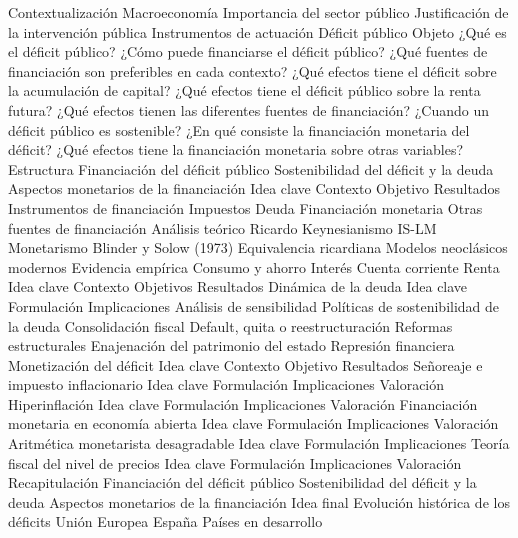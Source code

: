 \documentclass{nuevotema}
\begin{document}
\begin{esquema}[enumerate]
	\1[] 
		\2 Contextualización
			\3 Macroeconomía
			\3 Importancia del sector público
			\3 Justificación de la intervención pública
			\3 Instrumentos de actuación
			\3 Déficit público
		\2 Objeto
			\3 ¿Qué es el déficit público?
			\3 ¿Cómo puede financiarse el déficit público?
			\3 ¿Qué fuentes de financiación son preferibles en cada contexto?
			\3 ¿Qué efectos tiene el déficit sobre la acumulación de capital?
			\3 ¿Qué efectos tiene el déficit público sobre la renta futura?
			\3 ¿Qué efectos tienen las diferentes fuentes de financiación?
			\3 ¿Cuando un déficit público es sostenible?
			\3 ¿En qué consiste la financiación monetaria del déficit?
			\3 ¿Qué efectos tiene la financiación monetaria sobre otras variables?
		\2 Estructura
			\3 Financiación del déficit público
			\3 Sostenibilidad del déficit y la deuda
			\3 Aspectos monetarios de la financiación
	\1 
		\2 Idea clave
			\3 Contexto
			\3 Objetivo
			\3 Resultados
		\2 Instrumentos de financiación
			\3 Impuestos
			\3 Deuda
			\3 Financiación monetaria
			\3 Otras fuentes de financiación
		\2 Análisis teórico
			\3 Ricardo
			\3 Keynesianismo
			\3 IS-LM
			\3 Monetarismo
			\3 Blinder y Solow (1973)
			\3 Equivalencia ricardiana
			\3 Modelos neoclásicos modernos
		\2 Evidencia empírica
			\3 Consumo y ahorro
			\3 Interés
			\3 Cuenta corriente
			\3 Renta
	\1 
		\2 Idea clave
			\3 Contexto
			\3 Objetivos
			\3 Resultados
		\2 Dinámica de la deuda
			\3 Idea clave
			\3 Formulación
			\3 Implicaciones
			\3 Análisis de sensibilidad
		\2 Políticas de sostenibilidad de la deuda
			\3 Consolidación fiscal
			\3 Default, quita o reestructuración
			\3 Reformas estructurales
			\3 Enajenación del patrimonio del estado
			\3 Represión financiera
			\3 Monetización del déficit
	\1 
		\2 Idea clave
			\3 Contexto
			\3 Objetivo
			\3 Resultados
		\2 Señoreaje e impuesto inflacionario
			\3 Idea clave
			\3 Formulación
			\3 Implicaciones
			\3 Valoración
		\2 Hiperinflación
			\3 Idea clave
			\3 Formulación
			\3 Implicaciones
			\3 Valoración
		\2 Financiación monetaria en economía abierta
			\3 Idea clave
			\3 Formulación
			\3 Implicaciones
			\3 Valoración
		\2 Aritmética monetarista desagradable
			\3 Idea clave
			\3 Formulación
			\3 Implicaciones
		\2 Teoría fiscal del nivel de precios
			\3 Idea clave
			\3 Formulación
			\3 Implicaciones
			\3 Valoración
	\1[] 
		\2 Recapitulación
			\3 Financiación del déficit público
			\3 Sostenibilidad del déficit y la deuda
			\3 Aspectos monetarios de la financiación
		\2 Idea final
			\3 Evolución histórica de los déficits
			\3 Unión Europea
			\3 España
			\3 Países en desarrollo

\end{esquema}
\end{document}
